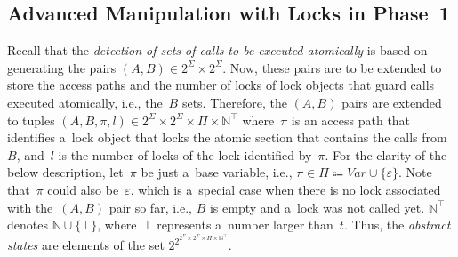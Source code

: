 \subsection{Advanced Manipulation with Locks in Phase~1}
\label{sec:proposalMultiLocksPhase1}

Recall that the \emph{detection of sets of calls to be executed atomically} is based on generating the pairs $ (A, B) \in 2^\Sigma \times 2^\Sigma $. Now, these pairs are to be extended to store the access paths and the number of locks of lock objects that guard calls executed atomically, i.e., the~$ B $ sets. Therefore, the $ (A, B) $ pairs are extended to tuples $ (A, B, \pi, l) \in 2^\Sigma \times 2^\Sigma \times \Pi \times \mathbb{N}^\top $ where~$ \pi $ is an access path that identifies a~lock object that locks the atomic section that contains the calls from~$ B $, and~$ l $ is the number of locks of the lock identified by~$ \pi $. For the clarity of the below description, let~$ \pi $ be just a~base variable, i.e., $ \pi \in \Pi \Coloneqq Var \cup \{\varepsilon\} $. Note that~$ \pi $ could also be~$ \varepsilon $, which is a~special case when there is no lock associated with the~$ (A, B) $ pair so far, i.e., $ B $ is empty and a~lock was not called yet. $ \mathbb{N}^\top $ denotes $ \mathbb{N} \cup \{\top\} $, where~$ \top $ represents a~number larger than~$ t $. Thus, the \emph{abstract states} are elements of the set $ 2^{2^{2^\Sigma \times 2^\Sigma \times \Pi \times \mathbb{N}^\top}} $.

